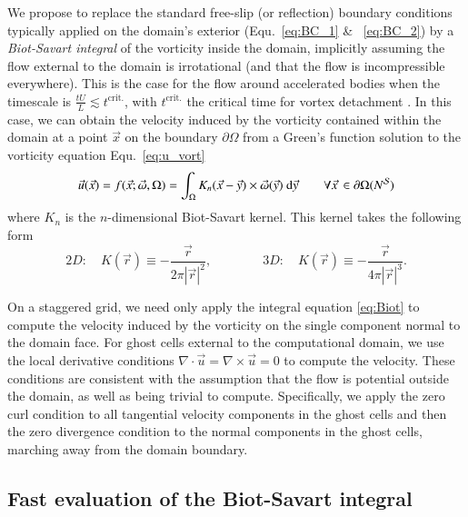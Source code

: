 \documentclass[preprint,12pt]{elsarticle}
\begin{document}
We propose to replace the standard free-slip (or reflection) boundary conditions typically applied on the domain's exterior (Equ.~\ref{eq:BC_1} \& ~\ref{eq:BC_2}) by a \emph{Biot-Savart integral} of the vorticity inside the domain, implicitly assuming the flow external to the domain is irrotational (and that the flow is incompressible everywhere). This is the case for the flow around accelerated bodies when the timescale is $\frac{tU}{L}\lesssim t^{\text{crit.}}$, with $t^{\text{crit.}}$ the critical time for vortex detachment \cite{Shusser2000EnergyRing}. In this case, we can obtain the velocity induced by the vorticity contained within the domain at a point $\vec x$ on the boundary $\partial\Omega$ from a Green's function solution to the vorticity equation Equ.~\ref{eq:u_vort}
\begin{equation}\label{eq:Biot}
    {\vec u}({\vec x}) = f(\vec x; \vec\omega,\Omega) = \int_\Omega K_{n}({\vec x} - \vec{y})\times \vec\omega({\vec y})\text{ d}\vec{y} \quad\quad \forall \vec x\, \in \partial\Omega (N^{\cal S})
\end{equation}
where $K_n$ is the $n$-dimensional Biot-Savart kernel. This kernel takes the following form \cite{Eldredge2019MathematicalFlows}
\begin{equation}
    2D:\quad K(\vec r)\equiv -\frac{\vec{r}}{2\pi|\vec{r}|^2}, \qquad\qquad 3D:\quad K(\vec r)\equiv -\frac{\vec{r}}{4\pi|\vec{r}|^3}.
\end{equation}

On a staggered grid, we need only apply the integral equation \ref{eq:Biot} to compute the velocity induced by the vorticity on the single component normal to the domain face. For ghost cells external to the computational domain, we use the local derivative conditions $\nabla\cdot\vec{u} = \nabla\times\vec{u}=0$ to compute the velocity. These conditions are consistent with the assumption that the flow is potential outside the domain, as well as being trivial to compute. Specifically, we apply the zero curl condition to all tangential velocity components in the ghost cells and then the zero divergence condition to the normal components in the ghost cells, marching away from the domain boundary.


\subsection{Fast evaluation of the Biot-Savart integral}
\end{document}
